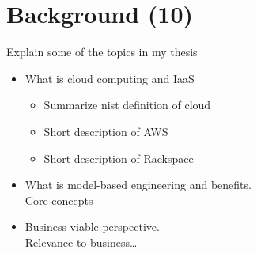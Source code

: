 \section{Background (10)}

Explain some of the topics in my thesis

\begin{itemize}
  \item What is cloud computing and IaaS
    \begin{itemize}
      \item Summarize nist definition of cloud
      \item Short description of AWS
      \item Short description of Rackspace
    \end{itemize}
  \item What is model-based engineering and benefits. \\
      Core concepts
  \item Business viable perspective. \\
    Relevance to business\ldots
\end{itemize}
